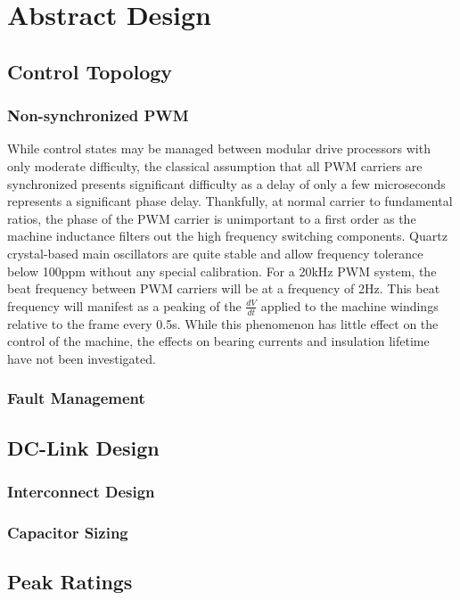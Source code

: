 \chapter{Abstract Design}

\section{Control Topology}


\subsection{Non-synchronized PWM}
While control states may be managed between modular drive processors with only
moderate difficulty, the classical assumption that all PWM carriers are
synchronized presents significant difficulty as a delay of only a few
microseconds represents a significant phase delay.
Thankfully, at normal carrier to fundamental ratios, the phase of the PWM
carrier is unimportant to a first order as the machine inductance filters out
the high frequency switching components.
Quartz crystal-based main oscillators are quite stable and allow frequency
tolerance below 100ppm without any special calibration.
For a 20kHz PWM system, the beat frequency between PWM carriers will be at a
frequency of 2Hz.
This beat frequency will manifest as a peaking of the $\frac{dV}{dt}$ applied
to the machine windings relative to the frame every 0.5s.
While this phenomenon has little effect on the control of the machine, the
effects on bearing currents and insulation lifetime have not been investigated.

\subsection{Fault Management}

\section{DC-Link Design}

\subsection{Interconnect Design}

\subsection{Capacitor Sizing}

\section{Peak Ratings}

